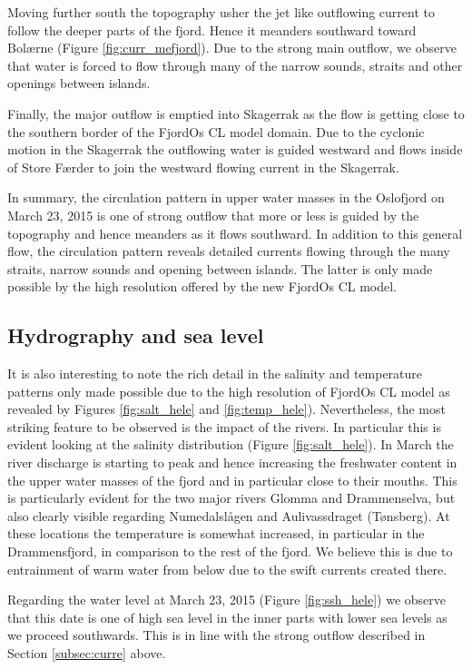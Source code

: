 Moving further south the topography usher the jet like outflowing current to follow the deeper parts of the fjord. Hence it meanders southward toward Bol{\ae}rne (Figure \ref{fig:curr_mefjord}). Due to the strong main outflow, we observe that water is forced to flow through many of the narrow sounds, straits and other openings between islands.    
  

Finally, the major outflow is emptied into Skagerrak as the flow is getting close to the southern border of the FjordOs CL model domain. Due to the cyclonic motion in the Skagerrak the outflowing water is guided westward and flows inside of Store F{\ae}rder to join the westward flowing current in the Skagerrak.    

In summary, the circulation pattern in upper water masses in the Oslofjord on March 23, 2015 is one of strong outflow that more or less is guided by the topography and hence meanders as it flows southward. In addition to this general flow, the circulation pattern reveals detailed currents flowing through the many straits, narrow sounds and opening between islands. The latter is only made possible by the high resolution offered by the new FjordOs CL model.

\clearpage
\subsection{Hydrography and sea level}
\label{subsec:hydro}
It is also interesting to note the rich detail in the salinity and temperature patterns only made possible due to the high resolution of FjordOs CL model as revealed by Figures \ref{fig:salt_hele} and \ref{fig:temp_hele}). Nevertheless, the most striking feature to be observed is the impact of the rivers. In particular this is evident looking at the salinity distribution (Figure \ref{fig:salt_hele}). In March the river discharge is starting to peak and hence increasing the freshwater content in the upper water masses of the fjord and in particular close to their mouths. This is particularly evident for the two major rivers Glomma and Drammenselva, but also clearly visible regarding Numedalsl{\aa}gen and Aulivassdraget (T{\o}nsberg). At these locations the temperature is somewhat increased, in particular in the Drammensfjord, in comparison to the rest of the fjord. We believe this is due to entrainment of warm water from below due to the swift currents created there.

Regarding the water level at March 23, 2015 (Figure \ref{fig:ssh_hele}) we observe that this date is one of high sea level in the inner parts with lower sea levels as we proceed southwards. This is in line with the strong outflow described in Section \ref{subsec:curre} above.
   
  
   
\clearpage
